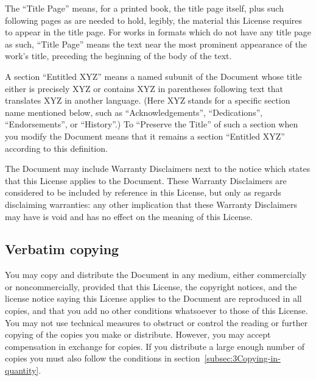 {\tiny{}The \textsf{``}Title Page\textsf{''} means, for a printed book, the title
page itself, plus such following pages as are needed to hold, legibly,
the material this License requires to appear in the title page. For
works in formats which do not have any title page as such, \textquotedblleft Title
Page\textquotedblright{} means the text near the most prominent appearance
of the work\textsf{'}s title, preceding the beginning of the body of the text.}{\tiny\par}

{\tiny{}A section \textsf{``}Entitled XYZ\textsf{''} means a named subunit of the
Document whose title either is precisely XYZ or contains XYZ in parentheses
following text that translates XYZ in another language. (Here XYZ
stands for a specific section name mentioned below, such as \textquotedblleft Acknowledgements\textquotedblright ,
\textquotedblleft Dedications\textquotedblright , \textquotedblleft Endorsements\textquotedblright ,
or \textquotedblleft History\textquotedblright .) To \textquotedblleft Preserve
the Title\textquotedblright{} of such a section when you modify the
Document means that it remains a section \textquotedblleft Entitled
XYZ\textquotedblright{} according to this definition.}{\tiny\par}

{\tiny{}The Document may include Warranty Disclaimers next to the
notice which states that this License applies to the Document. These
Warranty Disclaimers are considered to be included by reference in
this License, but only as regards disclaiming warranties: any other
implication that these Warranty Disclaimers may have is void and has
no effect on the meaning of this License.}{\tiny\par}

\subsection{Verbatim copying\label{subsec:2Verbatim-copying}}

{\tiny{}You may copy and distribute the Document in any medium, either
commercially or noncommercially, provided that this License, the copyright
notices, and the license notice saying this License applies to the
Document are reproduced in all copies, and that you add no other conditions
whatsoever to those of this License. You may not use technical measures
to obstruct or control the reading or further copying of the copies
you make or distribute. However, you may accept compensation in exchange
for copies. If you distribute a large enough number of copies you
must also follow the conditions in section~\ref{subsec:3Copying-in-quantity}.}{\tiny\par}

